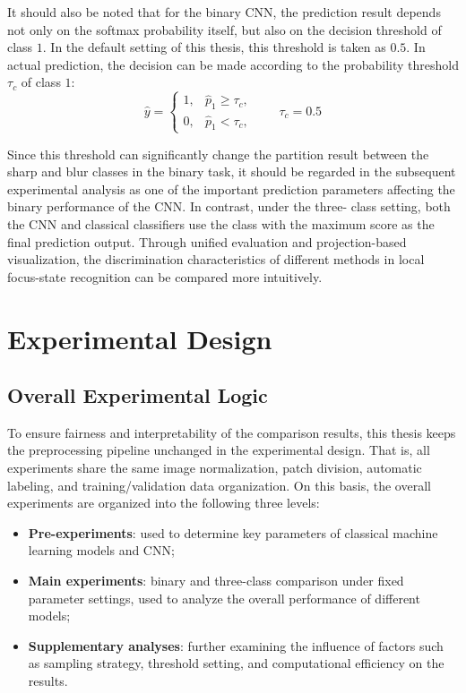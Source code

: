 \par It should also be noted that for the binary CNN, the prediction result
depends not only on the softmax probability itself, but also on the decision
threshold of class $1$. In the default setting of this thesis, this threshold
is taken as $0.5$. In actual prediction, the decision can be made according to
the probability threshold $\tau_c$ of class $1$:
\begin{equation}
    \hat{y}=
    \begin{cases}
        1, & \hat{p}_1\ge \tau_c, \\
        0, & \hat{p}_1<\tau_c,
    \end{cases}
    \qquad \tau_c=0.5
    \label{eq:cnn-binary-threshold}
\end{equation}
\par Since this threshold can significantly change the partition result between
the sharp and blur classes in the binary task, it should be regarded in the
subsequent experimental analysis as one of the important prediction parameters
affecting the binary performance of the CNN. In contrast, under the three-
class setting, both the CNN and classical classifiers use the class with the
maximum score as the final prediction output. Through unified evaluation and
projection-based visualization, the discrimination characteristics of
different methods in local focus-state recognition can be compared more
intuitively.

\section{Experimental Design}
\subsection{Overall Experimental Logic}
\par To ensure fairness and interpretability of the comparison results, this
thesis keeps the preprocessing pipeline unchanged in the experimental design.
That is, all experiments share the same image normalization, patch division,
automatic labeling, and training/validation data organization. On this basis,
the overall experiments are organized into the following three levels:
\begin{itemize}
    \item \textbf{Pre-experiments}: used to determine key parameters of
    classical machine learning models and CNN;
    \item \textbf{Main experiments}: binary and three-class comparison under
    fixed parameter settings, used to analyze the overall performance of
    different models;
    \item \textbf{Supplementary analyses}: further examining the influence of
    factors such as sampling strategy, threshold setting, and computational
    efficiency on the results.
\end{itemize}

